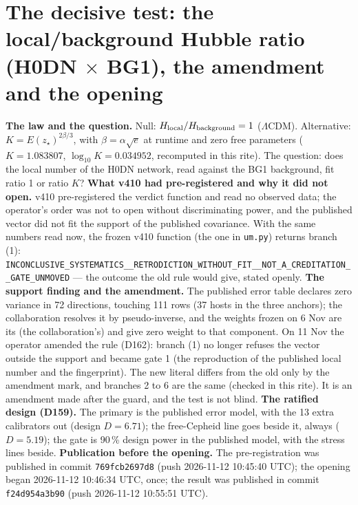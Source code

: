 \section*{The decisive test: the local/background Hubble ratio (H0DN $\times$ BG1), the amendment and the opening}
\textbf{The law and the question.} Null: $H_{\rm local}/H_{\rm background}=1$ ($\Lambda$CDM). Alternative: $K=E(z_\star)^{2\beta/3}$, with $\beta=\alpha\sqrt e$ at runtime and zero free parameters ($K=1.083807$, $\log_{10}K=0.034952$, recomputed in this rite). The question: does the local number of the H0DN network, read against the BG1 background, fit ratio 1 or ratio $K$?
\textbf{What v410 had pre-registered and why it did not open.} v410 pre-registered the verdict function and read no observed data; the operator's order was not to open without discriminating power, and the published vector did not fit the support of the published covariance. With the same numbers read now, the frozen v410 function (the one in \texttt{um.py}) returns branch (1): \texttt{INCONCLUSIVE\_\allowbreak{}SYSTEMATICS\_\allowbreak{}\_\allowbreak{}RETRODICTION\_\allowbreak{}WITHOUT\_\allowbreak{}FIT\_\allowbreak{}\_\allowbreak{}NOT\_\allowbreak{}A\_\allowbreak{}CREDITATION\_\allowbreak{}\_\allowbreak{}GATE\_\allowbreak{}UNMOVED} --- the outcome the old rule would give, stated openly.
\textbf{The support finding and the amendment.} The published error table declares zero variance in 72 directions, touching 111 rows (37 hosts in the three anchors); the collaboration resolves it by pseudo-inverse, and the weights frozen on 6 Nov are its (the collaboration's) and give zero weight to that component. On 11 Nov the operator amended the rule (D162): branch (1) no longer refuses the vector outside the support and became gate 1 (the reproduction of the published local number and the fingerprint). The new literal differs from the old only by the amendment mark, and branches 2 to 6 are the same (checked in this rite). It is an amendment made after the guard, and the test is not blind.
\textbf{The ratified design (D159).} The primary is the published error model, with the 13 extra calibrators out (design $D=6.71$); the free-Cepheid line goes beside it, always ($D=5.19$); the gate is 90\,\% design power in the published model, with the stress lines beside.
\textbf{Publication before the opening.} The pre-registration was published in commit \texttt{769fcb2697d8} (push 2026-11-12 10:45:40 UTC); the opening began 2026-11-12 10:46:34 UTC, once; the result was published in commit \texttt{f24d954a3b90} (push 2026-11-12 10:55:51 UTC).

